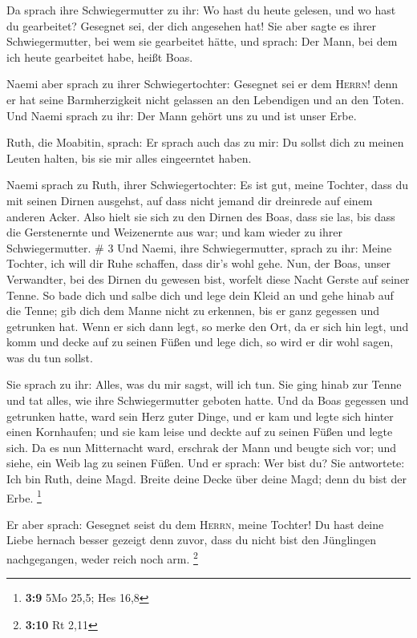  Da sprach ihre Schwiegermutter zu ihr: Wo hast du heute
gelesen, und wo hast du gearbeitet? Gesegnet sei, der dich angesehen
hat! Sie aber sagte es ihrer Schwiegermutter, bei wem sie gearbeitet
hätte, und sprach: Der Mann, bei dem ich heute gearbeitet habe, heißt
Boas.

 Naemi aber sprach zu ihrer Schwiegertochter: Gesegnet
sei er dem \textsc{Herrn}! denn er hat seine Barmherzigkeit nicht
gelassen an den Lebendigen und an den Toten. Und Naemi sprach zu ihr:
Der Mann gehört uns zu und ist unser Erbe.

 Ruth, die Moabitin, sprach: Er sprach auch das zu mir:
Du sollst dich zu meinen Leuten halten, bis sie mir alles eingeerntet
haben.

 Naemi sprach zu Ruth, ihrer Schwiegertochter: Es ist
gut, meine Tochter, dass du mit seinen Dirnen ausgehst, auf dass nicht
jemand dir dreinrede auf einem anderen Acker.  Also hielt
sie sich zu den Dirnen des Boas, dass sie las, bis dass die Gerstenernte
und Weizenernte aus war; und kam wieder zu ihrer Schwiegermutter. \# 3
 Und Naemi, ihre Schwiegermutter, sprach zu ihr: Meine
Tochter, ich will dir Ruhe schaffen, dass dir's wohl gehe.
 Nun, der Boas, unser Verwandter, bei des Dirnen du
gewesen bist, worfelt diese Nacht Gerste auf seiner Tenne.
 So bade dich und salbe dich und lege dein Kleid an und
gehe hinab auf die Tenne; gib dich dem Manne nicht zu erkennen, bis er
ganz gegessen und getrunken hat.  Wenn er sich dann legt,
so merke den Ort, da er sich hin legt, und komm und decke auf zu seinen
Füßen und lege dich, so wird er dir wohl sagen, was du tun sollst.

 Sie sprach zu ihr: Alles, was du mir sagst, will ich tun.
 Sie ging hinab zur Tenne und tat alles, wie ihre
Schwiegermutter geboten hatte.  Und da Boas gegessen und
getrunken hatte, ward sein Herz guter Dinge, und er kam und legte sich
hinter einen Kornhaufen; und sie kam leise und deckte auf zu seinen
Füßen und legte sich.  Da es nun Mitternacht ward,
erschrak der Mann und beugte sich vor; und siehe, ein Weib lag zu seinen
Füßen.  Und er sprach: Wer bist du? Sie antwortete: Ich
bin Ruth, deine Magd. Breite deine Decke über deine Magd; denn du bist
der Erbe. \footnote{\textbf{3:9} 5Mo 25,5; Hes 16,8}

 Er aber sprach: Gesegnet seist du dem \textsc{Herrn},
meine Tochter! Du hast deine Liebe hernach besser gezeigt denn zuvor,
dass du nicht bist den Jünglingen nachgegangen, weder reich noch arm.
\footnote{\textbf{3:10} Rt 2,11}

